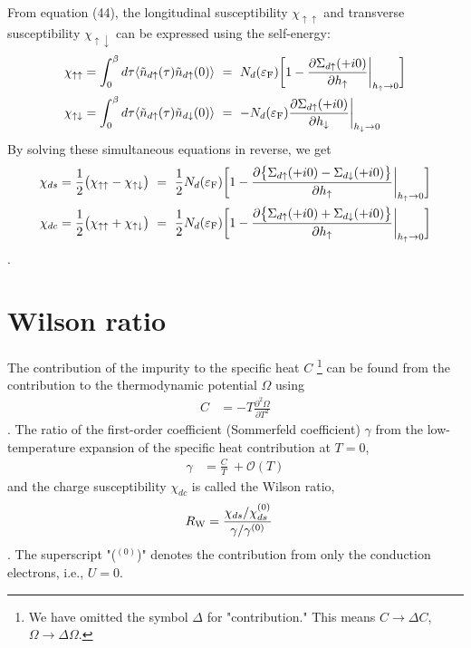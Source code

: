 \documentclass[a4j]{jarticle}
\begin{document}
From equation (44), the longitudinal susceptibility $\chi_{\uparrow \uparrow}$ and transverse susceptibility $\chi_{\uparrow \downarrow}$ can be expressed using the self-energy:
\begin{align}
	\chi_{\uparrow \uparrow}
	 & =
	\int^{\beta}_{0}d \tau
	\langle
	\tilde{n}_{d \uparrow}(\tau)
	\tilde{n}_{d \uparrow}(0)
	\rangle
	\ = \
	N_{d}(\varepsilon_{\rm F})
	\bigg[
		1
		-
		\frac{\partial \Sigma_{d \uparrow} (+i0) }{\partial h_{\uparrow}}
		\bigg|_{h_{\uparrow} \to 0}
		\bigg]
	\\
	\chi_{\uparrow \downarrow}
	 & =
	\int^{\beta}_{0}d \tau
	\langle
	\tilde{n}_{d \uparrow}(\tau)
	\tilde{n}_{d \downarrow}(0)
	\rangle
	\ = \
	-
	N_{d}(\varepsilon_{\rm F})
	\frac{\partial \Sigma_{d \uparrow} (+i0) }{\partial h_{\downarrow}}
	\bigg|_{h_{\downarrow} \to 0}
\end{align}
By solving these simultaneous equations in reverse, we get
\begin{align}
	\chi_{ds}
	 & =
	\frac{1}{2}
	\big(
	\chi_{\uparrow \uparrow}
	-
	\chi_{\uparrow \downarrow}
	\big)
	\ = \
	\frac{1}{2}
	N_{d}(\varepsilon_{\rm F})
	\bigg[
		1
		-
		\frac{\partial \big\{ \Sigma_{d \uparrow} (+i0) - \Sigma_{d \downarrow} (+i0) \big\} }{\partial h_{\uparrow}}
		\bigg|_{h_{\uparrow} \to 0}
		\bigg]
	\\
	\chi_{dc}
	 & =
	\frac{1}{2}
	\big(
	\chi_{\uparrow \uparrow}
	+
	\chi_{\uparrow \downarrow}
	\big)
	\ = \
	\frac{1}{2}
	N_{d}(\varepsilon_{\rm F})
	\bigg[
		1
		-
		\frac{\partial\big\{ \Sigma_{d \uparrow} (+i0) + \Sigma_{d \downarrow} (+i0) \big\} }{\partial h_{\uparrow}}
		\bigg|_{h_{\uparrow} \to 0}
		\bigg]
\end{align}
.

\section*{Wilson ratio}

The contribution of the impurity to the specific heat $C$
\footnote{We have omitted the symbol $\Delta$ for "contribution." This means $C \to \Delta C$, $\Omega \to \Delta \Omega$.}
can be found from the contribution to the thermodynamic potential $\Omega$ using
\begin{align}
	C
	 & =
	-T
	\frac{\partial^{2} \Omega}{\partial T^{2}}
\end{align}
.
The ratio of the first-order coefficient (Sommerfeld coefficient) $\gamma$ from the low-temperature expansion of the specific heat contribution at $T=0$,
\begin{align}
	\gamma
	 & =
	\frac{C}{T}
	\
	+
	\mathcal{O}(T)
\end{align}
and the charge susceptibility $\chi_{dc}$ is called the Wilson ratio,
\begin{align}
	R_{\rm W}
	 & =
	\frac{\chi_{ds}/\chi_{ds}^{(0)}}{\gamma/\gamma^{(0)}}
\end{align}
. The superscript "($^{(0)}$)" denotes the contribution from only the conduction electrons, i.e., $U=0$.
\end{document}
